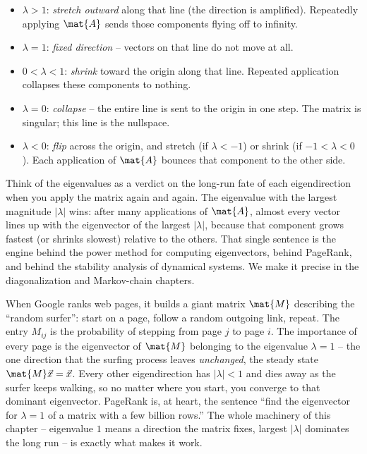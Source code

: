 \begin{itemize}
  \item $\lambda>1$: \emph{stretch outward} along that line (the direction is
        amplified). Repeatedly applying $\mat{A}$ sends those components flying
        off to infinity.
  \item $\lambda=1$: \emph{fixed direction} -- vectors on that line do not move at
        all.
  \item $0<\lambda<1$: \emph{shrink} toward the origin along that line. Repeated
        application collapses these components to nothing.
  \item $\lambda=0$: \emph{collapse} -- the entire line is sent to the origin in
        one step. The matrix is singular; this line is the nullspace.
  \item $\lambda<0$: \emph{flip} across the origin, and stretch (if
        $\lambda<-1$) or shrink (if $-1<\lambda<0$). Each application of $\mat{A}$
        bounces that component to the other side.
\end{itemize}

\begin{intuitionbox}
Think of the eigenvalues as a verdict on the long-run fate of each eigendirection
when you apply the matrix again and again. The eigenvalue with the largest
magnitude $|\lambda|$ wins: after many applications of $\mat{A}$, almost every
vector lines up with the eigenvector of the largest $|\lambda|$, because that
component grows fastest (or shrinks slowest) relative to the others. That single
sentence is the engine behind the power method for computing eigenvectors, behind
PageRank, and behind the stability analysis of dynamical systems. We make it
precise in the diagonalization and Markov-chain chapters.
\end{intuitionbox}

\begin{applicationbox}
When Google ranks web pages, it builds a giant matrix $\mat{M}$ describing the
``random surfer'': start on a page, follow a random outgoing link, repeat. The
entry $M_{ij}$ is the probability of stepping from page $j$ to page $i$. The
importance of every page is the eigenvector of $\mat{M}$ belonging to the
eigenvalue $\lambda=1$ -- the one direction that the surfing process leaves
\emph{unchanged}, the steady state $\mat{M}\vec{x}=\vec{x}$. Every other
eigendirection has $|\lambda|<1$ and dies away as the surfer keeps walking, so no
matter where you start, you converge to that dominant eigenvector. PageRank is, at
heart, the sentence ``find the eigenvector for $\lambda=1$ of a matrix with a few
billion rows.'' The whole machinery of this chapter -- eigenvalue $1$ means a
direction the matrix fixes, largest $|\lambda|$ dominates the long run -- is
exactly what makes it work.
\end{applicationbox}

